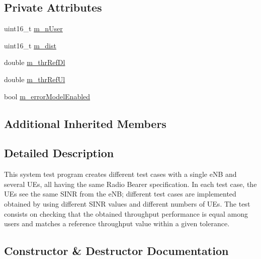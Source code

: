 \subsection*{Private Attributes}
\begin{DoxyCompactItemize}
\item 
uint16\+\_\+t \hyperlink{classLenaRrFfMacSchedulerTestCase_a8973c6783abfcb4f86d2eed09f96771e}{m\+\_\+n\+User}
\item 
uint16\+\_\+t \hyperlink{classLenaRrFfMacSchedulerTestCase_acfeb04f33db41e95247adca7a4bef11d}{m\+\_\+dist}
\item 
double \hyperlink{classLenaRrFfMacSchedulerTestCase_a143d8ff0ac04228cd56d32081b2e78c2}{m\+\_\+thr\+Ref\+Dl}
\item 
double \hyperlink{classLenaRrFfMacSchedulerTestCase_a8516d539e8d7702b317e2bba5f08c13f}{m\+\_\+thr\+Ref\+Ul}
\item 
bool \hyperlink{classLenaRrFfMacSchedulerTestCase_a9d0173c247c23e56278cd09225c4b7d5}{m\+\_\+error\+Model\+Enabled}
\end{DoxyCompactItemize}
\subsection*{Additional Inherited Members}


\subsection{Detailed Description}
This system test program creates different test cases with a single e\+NB and several U\+Es, all having the same Radio Bearer specification. In each test case, the U\+Es see the same S\+I\+NR from the e\+NB; different test cases are implemented obtained by using different S\+I\+NR values and different numbers of U\+Es. The test consists on checking that the obtained throughput performance is equal among users and matches a reference throughput value within a given tolerance. 

\subsection{Constructor \& Destructor Documentation}
